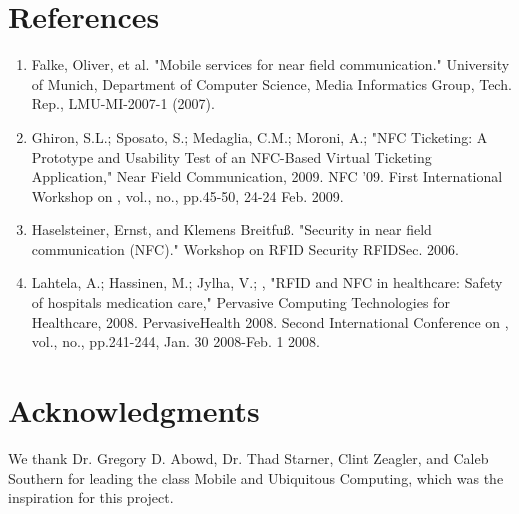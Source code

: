 \documentclass{sigchi}
\newcommand\tabhead[1]{\small\textbf{#1}}
\begin{document}
\section{References}

\begin{enumerate}
\item Falke, Oliver, et al. "Mobile services for near field communication." University of Munich, Department of Computer Science, Media Informatics Group, Tech. Rep., LMU-MI-2007-1 (2007).

\item Ghiron, S.L.; Sposato, S.; Medaglia, C.M.; Moroni, A.; "NFC Ticketing: A Prototype and Usability Test of an NFC-Based Virtual Ticketing Application," Near Field Communication, 2009. NFC '09. First International Workshop on , vol., no., pp.45-50, 24-24 Feb. 2009.

\item Haselsteiner, Ernst, and Klemens Breitfuß. "Security in near field communication (NFC)." Workshop on RFID Security RFIDSec. 2006.

\item Lahtela, A.; Hassinen, M.; Jylha, V.; , "RFID and NFC in healthcare: Safety of hospitals medication care," Pervasive Computing Technologies for Healthcare, 2008. PervasiveHealth 2008. Second International Conference on , vol., no., pp.241-244, Jan. 30 2008-Feb. 1 2008.
\end{enumerate}



\section{Acknowledgments}

We thank Dr. Gregory D. Abowd, Dr. Thad Starner, Clint Zeagler, and Caleb Southern for leading the class Mobile and Ubiquitous Computing, which was the inspiration for this project.
\end{document}
